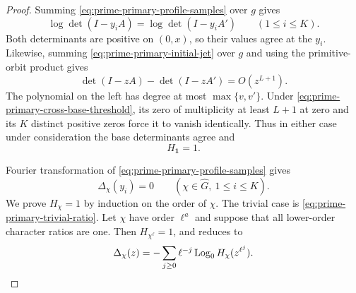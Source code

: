 \begin{proof}
Summing \eqref{eq:prime-primary-profile-samples} over \(g\) gives
\[
 \log\det(I-y_iA)=\log\det(I-y_iA')
 \qquad(1\le i\le K).
\]
Both determinants are positive on \((0,x)\), so their values agree at the
\(y_i\).  Likewise, summing \eqref{eq:prime-primary-initial-jet} over \(g\)
and using the primitive-orbit product gives
\[
 \det(I-zA)-\det(I-zA')=O(z^{L+1}).
\]
The polynomial on the left has degree at most \(\max\{v,v'\}\).  Under
\eqref{eq:prime-primary-cross-base-threshold}, its zero of multiplicity at
least \(L+1\) at zero and its \(K\) distinct positive zeros force it to
vanish identically.  Thus in either case under consideration the base
determinants agree and
\begin{equation}\label{eq:prime-primary-trivial-ratio}
 H_{\mathbf1}=1.
\end{equation}

Fourier transformation of \eqref{eq:prime-primary-profile-samples} gives
\begin{equation}\label{eq:prime-primary-fourier-samples}
 \Delta_\chi(y_i)=0
 \qquad(\chi\in\widehat G,\ 1\le i\le K).
\end{equation}
We prove \(H_\chi=1\) by induction on the order of \(\chi\).  The trivial
case is \eqref{eq:prime-primary-trivial-ratio}.  Let \(\chi\) have order
\(\ell^a\) and suppose that all lower-order character ratios are one.  Then
\(H_{\chi^\ell}=1\), and
 reduces to
\begin{equation}\label{eq:prime-primary-one-orbit}
 \Delta_\chi(z)
 =-\sum_{j\ge0}\ell^{-j}\operatorname{Log}_0H_\chi(z^{\ell^j}).
\end{equation}


\end{proof}
